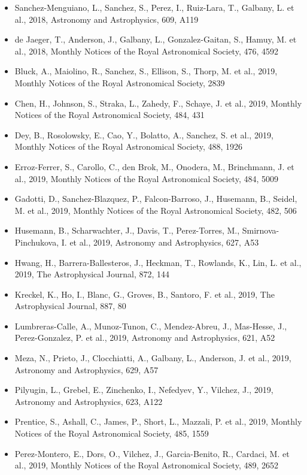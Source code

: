 \documentclass{letter}
\begin{document}
\begin{enumerate}
\begin{itemize}
\item Sanchez-Menguiano, L., Sanchez, S., Perez, I., Ruiz-Lara, T., Galbany, L. et al., 2018, Astronomy and Astrophysics, 609, A119
\item de Jaeger, T., Anderson, J., Galbany, L., Gonzalez-Gaitan, S., Hamuy, M. et al., 2018, Monthly Notices of the Royal Astronomical Society, 476, 4592
\item Bluck, A., Maiolino, R., Sanchez, S., Ellison, S., Thorp, M. et al., 2019, Monthly Notices of the Royal Astronomical Society, 2839
\item Chen, H., Johnson, S., Straka, L., Zahedy, F., Schaye, J. et al., 2019, Monthly Notices of the Royal Astronomical Society, 484, 431
\item Dey, B., Rosolowsky, E., Cao, Y., Bolatto, A., Sanchez, S. et al., 2019, Monthly Notices of the Royal Astronomical Society, 488, 1926
\item Erroz-Ferrer, S., Carollo, C., den Brok, M., Onodera, M., Brinchmann, J. et al., 2019, Monthly Notices of the Royal Astronomical Society, 484, 5009
\item Gadotti, D., Sanchez-Blazquez, P., Falcon-Barroso, J., Husemann, B., Seidel, M. et al., 2019, Monthly Notices of the Royal Astronomical Society, 482, 506
\item Husemann, B., Scharwachter, J., Davis, T., Perez-Torres, M., Smirnova-Pinchukova, I. et al., 2019, Astronomy and Astrophysics, 627, A53
\item Hwang, H., Barrera-Ballesteros, J., Heckman, T., Rowlands, K., Lin, L. et al., 2019, The Astrophysical Journal, 872, 144
\item Kreckel, K., Ho, I., Blanc, G., Groves, B., Santoro, F. et al., 2019, The Astrophysical Journal, 887, 80
\item Lumbreras-Calle, A., Munoz-Tunon, C., Mendez-Abreu, J., Mas-Hesse, J., Perez-Gonzalez, P. et al., 2019, Astronomy and Astrophysics, 621, A52
\item Meza, N., Prieto, J., Clocchiatti, A., Galbany, L., Anderson, J. et al., 2019, Astronomy and Astrophysics, 629, A57
\item Pilyugin, L., Grebel, E., Zinchenko, I., Nefedyev, Y., Vilchez, J., 2019, Astronomy and Astrophysics, 623, A122
\item Prentice, S., Ashall, C., James, P., Short, L., Mazzali, P. et al., 2019, Monthly Notices of the Royal Astronomical Society, 485, 1559
\item Perez-Montero, E., Dors, O., Vilchez, J., Garcia-Benito, R., Cardaci, M. et al., 2019, Monthly Notices of the Royal Astronomical Society, 489, 2652

\end{itemize}
\end{enumerate}
\end{document}
